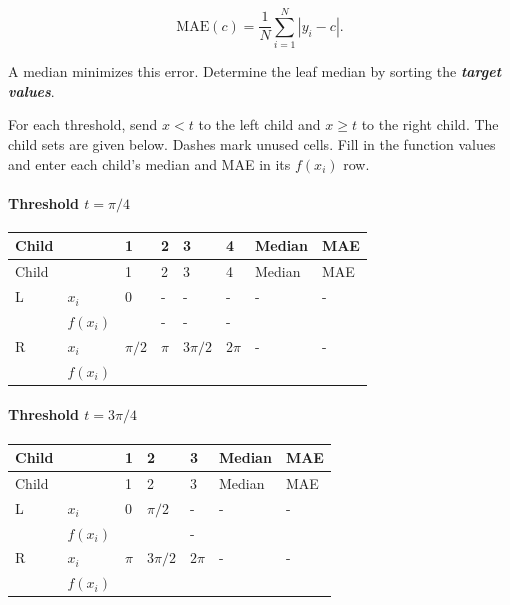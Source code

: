 \documentclass{course_sheet}
\begin{document}
\[
\mathrm{MAE}(c)=\frac1N\sum_{i=1}^{N}|y_i-c|.
\]

A median minimizes this error. Determine the leaf median by sorting the \textbf{\textit{target values}}.

For each threshold, send $x<t$ to the left child and $x\geq t$ to the right child. The child sets are given below. Dashes mark unused cells. Fill in the function values and enter each child's median and MAE in its $f(x_i)$ row.

\paragraph*{Threshold $t=\pi/4$}
\begingroup
\small
\setlength{\tabcolsep}{4pt}
\begin{longtable}{l|l|l|l|l|l|l|l}
Child &  & 1 & 2 & 3 & 4 & Median & MAE \\
\hline
\endfirsthead
Child &  & 1 & 2 & 3 & 4 & Median & MAE \\
\hline
\endhead
L & $x_i$ & $0$ & - & - & - & - & - \\[3pt]
 & $f(x_i)$ & $\phantom{0}$ & - & - & - & $\phantom{0}$ & $\phantom{0}$ \\[3pt]
R & $x_i$ & $\pi/2$ & $\pi$ & $3\pi/2$ & $2\pi$ & - & - \\[3pt]
 & $f(x_i)$ & $\phantom{0}$ & $\phantom{0}$ & $\phantom{0}$ & $\phantom{0}$ & $\phantom{0}$ & $\phantom{0}$ \\[3pt]
\end{longtable}
\endgroup
\paragraph*{Threshold $t=3\pi/4$}
\begingroup
\small
\setlength{\tabcolsep}{4pt}
\begin{longtable}{l|l|l|l|l|l|l}
Child &  & 1 & 2 & 3 & Median & MAE \\
\hline
\endfirsthead
Child &  & 1 & 2 & 3 & Median & MAE \\
\hline
\endhead
L & $x_i$ & $0$ & $\pi/2$ & - & - & - \\[3pt]
 & $f(x_i)$ & $\phantom{0}$ & $\phantom{0}$ & - & $\phantom{0}$ & $\phantom{0}$ \\[3pt]
R & $x_i$ & $\pi$ & $3\pi/2$ & $2\pi$ & - & - \\[3pt]
 & $f(x_i)$ & $\phantom{0}$ & $\phantom{0}$ & $\phantom{0}$ & $\phantom{0}$ & $\phantom{0}$ \\[3pt]
\end{longtable}
\endgroup
\end{document}
